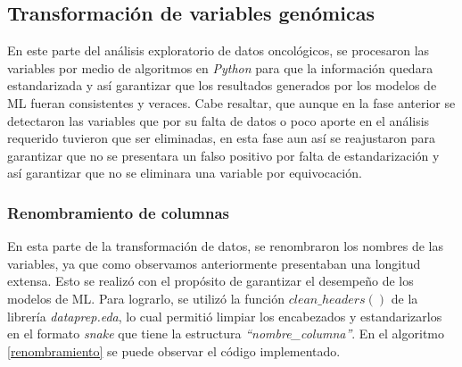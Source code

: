 \newpage
\subsection{Transformación de variables genómicas}
En este parte del análisis exploratorio de datos oncológicos, se procesaron las variables por medio de algoritmos en \textit{Python} para que la información quedara estandarizada y así garantizar que los resultados generados por los modelos de ML fueran consistentes y veraces. Cabe resaltar, que aunque en la fase anterior se detectaron las variables que por su falta de datos o poco aporte en el análisis requerido tuvieron que ser eliminadas, en esta fase aun así se reajustaron para garantizar que no se presentara un falso positivo por falta de estandarización y así garantizar que no se eliminara una variable por equivocación.

\subsubsection{Renombramiento de columnas}
En esta parte de la transformación de datos, se renombraron los nombres de las variables, ya que como observamos anteriormente presentaban una longitud extensa. Esto se realizó con el propósito de garantizar el desempeño de los modelos de ML. Para lograrlo, se utilizó la función $clean\_headers()$ de la librería \textit{dataprep.eda}, lo cual permitió limpiar los encabezados y estandarizarlos en el formato \textit{snake} que tiene la estructura \textit{“nombre\_columna”}. En el algoritmo \ref{renombramiento} se puede observar el código implementado.

